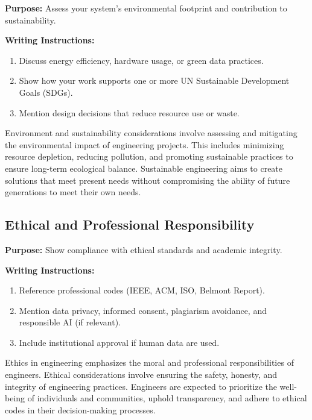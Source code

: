 {\color{blue}\textbf{Purpose:}
Assess your system’s environmental footprint and contribution to sustainability.} \\

{\color{red}\textbf{Writing Instructions:}
\begin{enumerate}
    \item Discuss energy efficiency, hardware usage, or green data practices.
    
    \item Show how your work supports one or more UN Sustainable Development Goals (SDGs).
    
    \item Mention design decisions that reduce resource use or waste.
\end{enumerate}

Environment and sustainability considerations involve assessing and mitigating the environmental impact of engineering projects. This includes minimizing resource depletion, reducing pollution, and promoting sustainable practices to ensure long-term ecological balance. Sustainable engineering aims to create solutions that meet present needs without compromising the ability of future generations to meet their own needs.}

\subsection{Ethical and Professional Responsibility}

{\color{blue}\textbf{Purpose:}
Show compliance with ethical standards and academic integrity.} \\

{\color{red}\textbf{Writing Instructions:}
\begin{enumerate}
    \item Reference professional codes (IEEE, ACM, ISO, Belmont Report).
    
    \item Mention data privacy, informed consent, plagiarism avoidance, and responsible AI (if relevant).
    
    \item Include institutional approval if human data are used.
\end{enumerate}
Ethics in engineering emphasizes the moral and professional responsibilities of engineers. Ethical considerations involve ensuring the safety, honesty, and integrity of engineering practices. Engineers are expected to prioritize the well-being of individuals and communities, uphold transparency, and adhere to ethical codes in their decision-making processes.}
